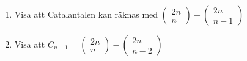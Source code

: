 \documentclass{tufte-handout}
\begin{document}
\begin{xca}
  \hspace{1cm}\par
  \begin{enumerate}[label=(\alph*)]
    \item Visa att Catalantalen kan räknas med $\begin{pmatrix}2n\\n\end{pmatrix}-\begin{pmatrix}2n\\n-1\end{pmatrix}$
    \item Visa att $C_{n+1} = \begin{pmatrix}2n\\n\end{pmatrix}-\begin{pmatrix}2n\\n-2\end{pmatrix}$
  \end{enumerate}
\end{xca}
\end{document}
